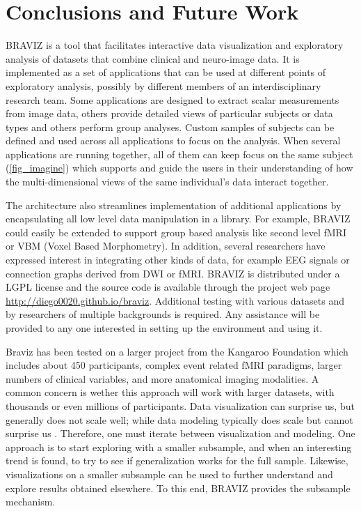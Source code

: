 \documentclass{frontiersHLTH}
\begin{document}
\section{Conclusions and Future Work}


BRAVIZ is a tool that facilitates interactive data visualization and exploratory analysis of datasets that combine clinical and neuro-image data. It is implemented as a set of applications that can be used at different points of exploratory analysis, possibly by different members of an interdisciplinary research team. Some applications are designed to extract scalar measurements from image data, others provide detailed views of particular subjects or data types and others perform group analyses. Custom samples of subjects can be defined and used across all applications to focus on the analysis. When several applications are running together, all of them can keep focus on the same subject (\ref{fig_imagine}) which supports and guide the users in their understanding of how the multi-dimensional views of the same individual's data interact together.

The architecture also streamlines implementation of additional applications by encapsulating all low level data manipulation in a library. For example, BRAVIZ could easily be extended to support group based analysis like second level fMRI or VBM (Voxel Based Morphometry). In addition, several researchers have expressed interest in integrating other kinds of data, for example EEG signals or connection graphs \cite{rubinov_complex_2010} derived from DWI or fMRI.  BRAVIZ is distributed under a LGPL license and the source code is available through the project web page \url{http://diego0020.github.io/braviz}. Additional testing with various datasets and by researchers of multiple backgrounds is required. Any assistance will be provided to any one interested in setting up the environment and using it. 

Braviz has been tested on a larger project from the Kangaroo Foundation which includes about 450 participants, complex event related fMRI paradigms, larger numbers of clinical variables, and more anatomical imaging modalities. A common concern is wether this approach will work with larger datasets, with thousands or even millions of participants. Data visualization can surprise us, but generally does not scale well; while data modeling typically does scale but cannot surprise us \cite{grolemund_r_2016}. Therefore, one must iterate between visualization and modeling. One approach is to start exploring with a smaller subsample, and when an interesting trend is found, to try to see if generalization works for the full sample. Likewise, visualizations on a smaller subsample can be used to further understand and explore results obtained elsewhere. To this end, BRAVIZ provides the subsample mechanism.
\end{document}
